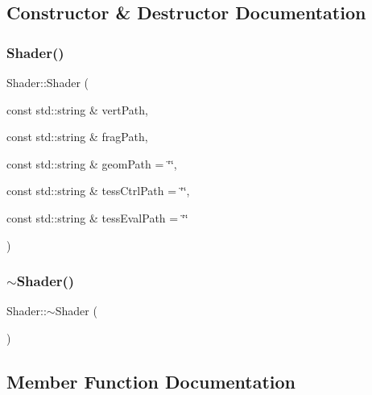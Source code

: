 \subsection{Constructor \& Destructor Documentation}
\mbox{\label{classec_1_1_shader_a8fe213cc5bf88e3959fd0334c384b9ab}} 
\subsubsection{\texorpdfstring{Shader()}{Shader()}}
{\footnotesize\ttfamily Shader\+::\+Shader (\begin{DoxyParamCaption}\item[{const std\+::string \&}]{vert\+Path,  }\item[{const std\+::string \&}]{frag\+Path,  }\item[{const std\+::string \&}]{geom\+Path = {\ttfamily \char`\"{}\char`\"{}},  }\item[{const std\+::string \&}]{tess\+Ctrl\+Path = {\ttfamily \char`\"{}\char`\"{}},  }\item[{const std\+::string \&}]{tess\+Eval\+Path = {\ttfamily \char`\"{}\char`\"{}} }\end{DoxyParamCaption})}

\mbox{\label{classec_1_1_shader_aff01df87e8a102f270b5b135a295e59d}} 
\subsubsection{\texorpdfstring{$\sim$\+Shader()}{~Shader()}}
{\footnotesize\ttfamily Shader\+::$\sim$\+Shader (\begin{DoxyParamCaption}{ }\end{DoxyParamCaption})}



\subsection{Member Function Documentation}
\mbox{\label{classec_1_1_shader_a8b5c8c4788d011a65d158ef8428d1ece}} 
